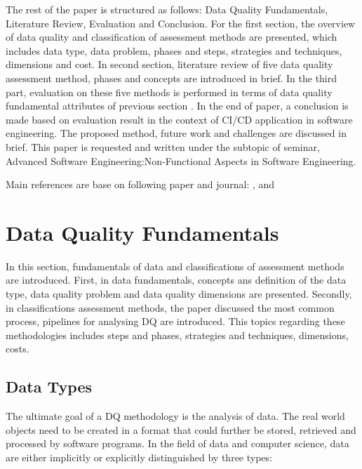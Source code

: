 \documentclass[pdftex,english,oribibl]{llncs}
\begin{document}
The rest of the paper is structured as follows: Data Quality Fundamentals, Literature Review, Evaluation and Conclusion.
For the first section, the overview of data quality and classification of assessment methods are presented,
which includes data type, data problem, phases and steps, strategies and techniques, dimensions and cost.
In second section, literature review of five data quality assessment method, phases and concepts are introduced in brief.
In the third part, evaluation on these five methods is performed in terms of data quality fundamental attributes of previous section .
In the end of paper, a conclusion is made based on evaluation result in the context of CI/CD application in software engineering.
The proposed method, future work and challenges are discussed in brief.
This paper is requested and written under the subtopic of seminar, Advanced Software Engineering:Non-Functional Aspects in Software Engineering.

Main references are base on following paper and journal: \citet{Cai2005ChallnegesOfDataQuality}, \citet{Pipino2002DataQualityAssessment} and \citet{Batini2009MethodologiesForDataQuality} \citet{Wang1996BeyondAccuracy} \citet{Borek2011AClassficationOfDataQualityAssessmentMethods}
   \citet{Cappiello2004DataQualityAssessmentfromTheUse}


\section{Data Quality Fundamentals}
In this section, fundamentals of data and classifications of assessment methods are introduced.
First, in data fundamentals, concepts ans definition of the data type, data quality problem and data quality dimensions are presented. Secondly, in classifications assessment methods, the paper discussed the most common process, pipelines for analysing DQ are introduced.
This topics regarding these methodologies includes steps and phases, strategies and techniques, dimensions, costs.

\subsection{Data Types}
The ultimate goal of a DQ methodology is the analysis of data.
The real world objects need to be created in a format that could further be stored, retrieved and processed by software programs.
In the field of data and computer science, data are either implicitly or explicitly distinguished by three types:
\end{document}
